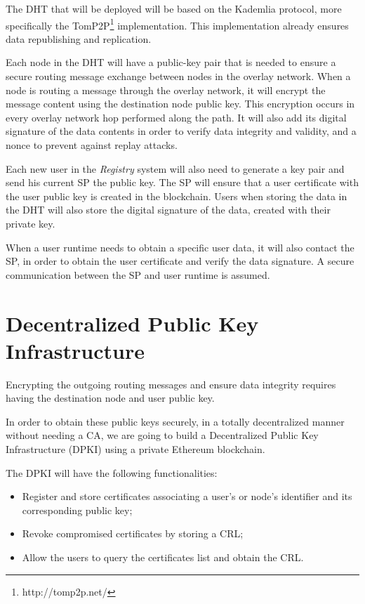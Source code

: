 The DHT that will be deployed will be based on the Kademlia protocol, more specifically the TomP2P\footnote{http://tomp2p.net/} implementation. This implementation already ensures data republishing and replication.

Each node in the DHT will have a public-key pair that is needed to ensure a secure routing message exchange between nodes in the overlay network.  When a node is routing a message through the overlay network, it will encrypt the message content using the destination node public key.
This encryption occurs in every overlay network hop performed along the path.
It will also add its digital signature of the data contents in order to verify data integrity and validity, and a nonce to prevent against replay attacks.

Each new user in the \textit{Registry} system will also need to generate a key pair and send his current SP the public key. The SP will ensure that a user certificate with the user public key is created in the blockchain.
Users when storing the data in the DHT will also store the digital signature of the data, created with their private key.

When a user runtime needs to obtain a specific user data, it will also contact the SP, in order to obtain the user certificate and verify the data signature. A secure communication between the SP and user runtime is assumed.

\section{Decentralized Public Key Infrastructure} \label{ssec:blockchain}

Encrypting the outgoing routing messages and ensure data integrity requires having the destination node and user public key.

In order to obtain these public keys securely, in a totally decentralized manner without needing a CA, we are going to build a Decentralized Public Key Infrastructure (DPKI) using a private Ethereum blockchain.

The DPKI will have the following functionalities:
\begin{itemize}
	\item Register and store certificates associating a user's or node's identifier and its corresponding public key;
	\item Revoke compromised certificates by storing a CRL;
	\item Allow the users to query the certificates list and obtain the CRL.
\end{itemize}

